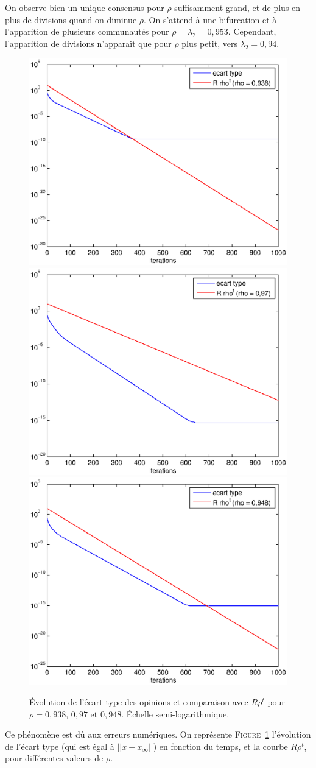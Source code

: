\documentclass[12pt]{article}
\newcommand{\fig}[1]{\textsc{Figure}~\ref{#1}}
\begin{document}
On observe bien un unique consensus pour $\rho$ suffisamment grand, et
de plus en plus de divisions quand on diminue $\rho$. On s'attend
à une bifurcation et à l'apparition de plusieurs communautés pour
$\rho = \lambda_2 = 0,953$. Cependant, l'apparition de divisions
n'apparaît que pour $\rho$ plus petit, vers $\lambda_2 = 0,94$.
\begin{figure}[htb]
	\begin{center}
		\includegraphics[width=.4\textwidth]{var_rho_0938}
		\includegraphics[width=.4\textwidth]{var_rho_097}
		\includegraphics[width=.5\textwidth]{var_rho_0948}
		\caption{Évolution de l'écart type des opinions et
                  comparaison avec $R \rho^t$ pour $\rho = 0,938$,
                  $0,97$ et $0,948$. Échelle semi-logarithmique.}
		\label{num_coupure}
	\end{center}
\end{figure}
Ce phénomène est dû aux erreurs numériques. On représente
\fig{num_coupure} l'évolution de l'écart type (qui est égal à $||x -
x_\infty||$) en fonction du temps, et la courbe $R \rho^t$, pour
différentes valeurs de $\rho$.
\end{document}
